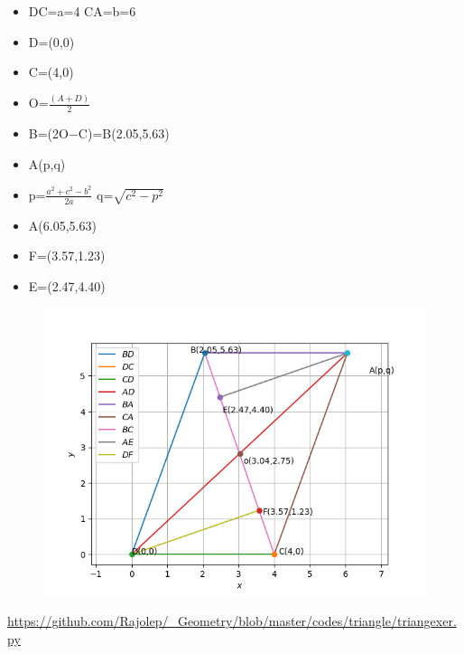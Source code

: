 \begin{frame}

\begin{itemize}
\item DC=a=4  CA=b=6
\item D=(0,0) \\
\item C=(4,0)\\
\item O=$\frac{(A+D)}{2}$ \\
\item B=(2O$-$C)=B(2.05,5.63)\\
\item A(p,q)\\
\item p=$\frac{a^2+c^2-b^2}{2a}$ q=$\sqrt{c^2-p^2}$\\
\item A(6.05,5.63)\\
\item F=(3.57,1.23)\\
\item E=(2.47,4.40)
\end{itemize}

\end{frame}
\begin{frame}
\begin{figure}
\includegraphics[scale=0.4]{./figs/triexe.png}
\end{figure}
\url{https://github.com/Rajolep/_Geometry/blob/master/codes/triangle/triangexer.py}
\end{frame}
